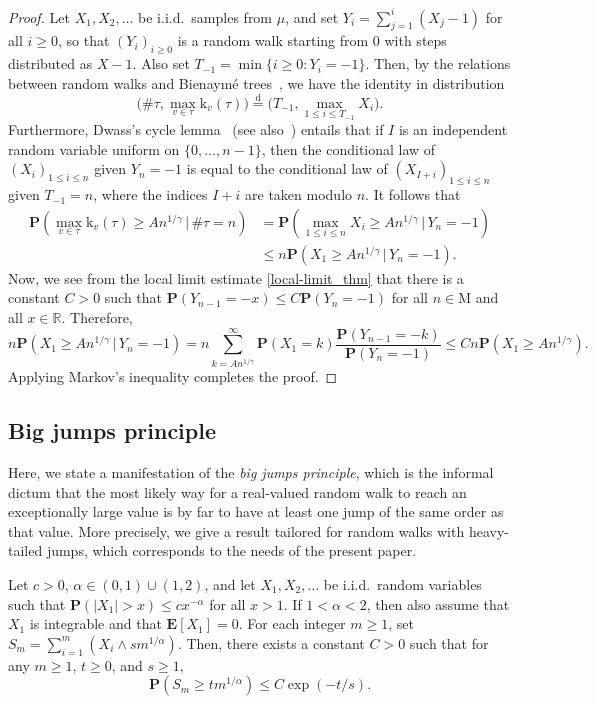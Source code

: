 \documentclass[11pt,reqno]{amsart}
\renewcommand{\P}{\mathbf{P}}
\newcommand{\R}{\mathbb{R}}
\newcommand{\1}{\mathbf{1}}
\newcommand{\0}{\mathbf{0}}
\newcommand{\E}{{\mathbf E}}
\newcommand{\eqdist}{\ensuremath{\stackrel{\mathrm{d}}{=}}}
\newcommand{\prob}{\mathbf{P}}
\newcommand{\rk}{\mathrm{k}}
\begin{document}
\begin{proof}
Let $X_1,X_2,\ldots$ be i.i.d.~samples from $\mu$, and set $Y_i=\sum_{j=1}^i (X_j-1)$ for all $i\geq 0$, so that $(Y_i)_{i\ge 0}$ is a random walk starting from $0$ with steps distributed as $X-1$. Also set $T_{-1}=\min\{i\geq 0:Y_i=-1\}$. Then, by the relations between random walks and Bienaymé trees~\cite[Corollary 1.6]{legall2005random}, we have the identity in distribution
\[\Big(\#\tau,\max_{v\in\tau}\rk_v(\tau)\Big) \eqdist \Big(T_{-1},\max_{1\leq i\leq T_{-1}}X_i\Big).\]
Furthermore, Dwass's cycle lemma~\cite{dwass} (see also~\cite[Lemma~15.3]{JansonSurvey}) entails that if $I$ is an independent random variable uniform on $\{0,\ldots,n-1\}$, then the conditional law of $(X_i)_{1\leq i\leq n}$ given $Y_n={-1}$ is equal to the conditional law of $(X_{I+i})_{1\leq i\leq n}$ given $T_{-1}=n$, where the indices $I+i$ are taken modulo $n$. It follows that
\begin{align*}
\prob\left( \max_{v \in \tau} \rk_v(\tau) \geq An^{1/\gamma} \,\big|\, \#\tau =n \right)&=\prob\left(\max_{1\leq i\leq n} X_i\geq An^{1/\gamma} \,\big|\, Y_n=-1\right)\\
&\leq n\prob\left(X_1\geq An^{1/\gamma} \,\big|\, Y_n=-1\right).
\end{align*}
Now, we see from the local limit estimate \eqref{local-limit_thm} that there is a constant $C > 0$ such that $\prob(Y_{n-1}=-x)\leq C\prob(Y_n=-1)$ for all $n\in\mathrm{M}$ and all $x\in\R$. Therefore,
\[n\prob\left(X_1\geq An^{1/\gamma} \,\big|\, Y_n=-1\right)=n\sum_{k=An^{1/\gamma}}^{\infty} \prob(X_1 = k)\frac{\prob(Y_{n-1} = -k)}{\prob(Y_n=-1)}\leq Cn\prob(X_1\geq An^{1/\gamma}).\]
Applying Markov's inequality completes the proof.
\end{proof}


\subsection{Big jumps principle}

Here, we state a manifestation of the \emph{big jumps principle}, which is the informal dictum that the most likely way for a real-valued random walk to reach an exceptionally large value is by far to have at least one jump of the same order as that value. More precisely, we give a result tailored for random walks with heavy-tailed jumps, which corresponds to the needs of the present paper.

\begin{prop}\label{obj_0-1and1-2}
Let $c>0$, $\alpha\in (0,1)\cup (1,2)$, and let $X_1,X_2,\dots$ be i.i.d.~random variables such that $\P(|X_1|>x)\leq c x^{-\alpha}$ for all $x>1$. If $1<\alpha<2$, then also assume that $X_1$ is integrable and that $\E[X_1]=0$. For each integer $m\geq 1$, set $S_m=\sum_{i=1}^m (X_i\wedge s m^{1/\alpha})$. Then, there exists a constant $C>0$ such that for any $m\ge 1$, $t\geq 0$, and $s\geq 1$,
\[\P(S_m\ge t m^{1/\alpha})\le C \exp(-t/s) .\]
\end{prop}
\end{document}
